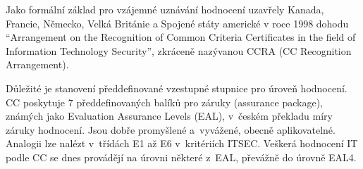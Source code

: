 \documentclass[a4paper,12pt]{article}
\begin{document}
Jako formální základ pro vzájemné uznávání hodnocení uzavřely Kanada, Francie, Německo, Velká Británie a Spojené státy americké v roce 1998 dohodu “Arrangement on the Recognition of
Common Criteria Certificates in the field of Information Technology Security”, zkráceně nazývanou CCRA (CC Recognition Arrangement).\cite{NBUHodnoceniBezpecnostiSW}

Důležité je stanovení předdefinované vzestupné stupnice pro úroveň hodnocení. CC poskytuje 7 předdefinovaných balíků pro záruky (assurance package), známých jako Evaluation Assurance Levels (EAL), v~českém překladu míry záruky hodnocení. Jsou dobře promyšlené a~vyvážené, obecně aplikovatelné. Analogii lze nalézt v~třídách E1 až E6 v~kritériích ITSEC. Veškerá hodnocení IT podle CC se dnes provádějí na úrovni některé z~EAL, převážně do úrovně EAL4.
\end{document}
